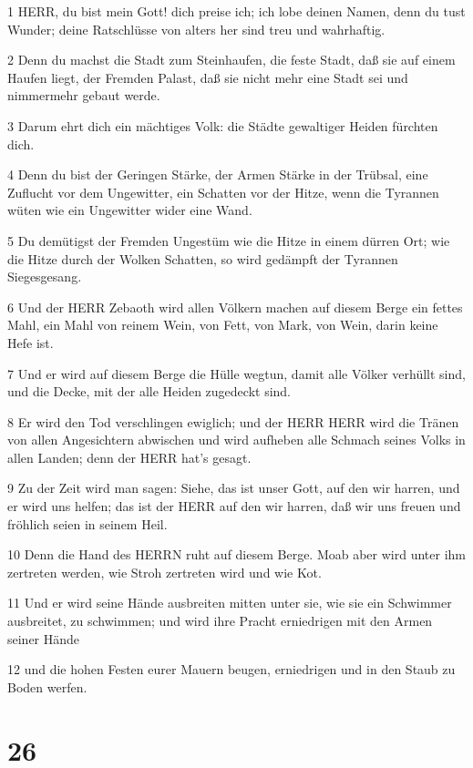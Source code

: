 \par 1 HERR, du bist mein Gott! dich preise ich; ich lobe deinen Namen, denn du tust Wunder; deine Ratschlüsse von alters her sind treu und wahrhaftig.
\par 2 Denn du machst die Stadt zum Steinhaufen, die feste Stadt, daß sie auf einem Haufen liegt, der Fremden Palast, daß sie nicht mehr eine Stadt sei und nimmermehr gebaut werde.
\par 3 Darum ehrt dich ein mächtiges Volk: die Städte gewaltiger Heiden fürchten dich.
\par 4 Denn du bist der Geringen Stärke, der Armen Stärke in der Trübsal, eine Zuflucht vor dem Ungewitter, ein Schatten vor der Hitze, wenn die Tyrannen wüten wie ein Ungewitter wider eine Wand.
\par 5 Du demütigst der Fremden Ungestüm wie die Hitze in einem dürren Ort; wie die Hitze durch der Wolken Schatten, so wird gedämpft der Tyrannen Siegesgesang.
\par 6 Und der HERR Zebaoth wird allen Völkern machen auf diesem Berge ein fettes Mahl, ein Mahl von reinem Wein, von Fett, von Mark, von Wein, darin keine Hefe ist.
\par 7 Und er wird auf diesem Berge die Hülle wegtun, damit alle Völker verhüllt sind, und die Decke, mit der alle Heiden zugedeckt sind.
\par 8 Er wird den Tod verschlingen ewiglich; und der HERR HERR wird die Tränen von allen Angesichtern abwischen und wird aufheben alle Schmach seines Volks in allen Landen; denn der HERR hat's gesagt.
\par 9 Zu der Zeit wird man sagen: Siehe, das ist unser Gott, auf den wir harren, und er wird uns helfen; das ist der HERR auf den wir harren, daß wir uns freuen und fröhlich seien in seinem Heil.
\par 10 Denn die Hand des HERRN ruht auf diesem Berge. Moab aber wird unter ihm zertreten werden, wie Stroh zertreten wird und wie Kot.
\par 11 Und er wird seine Hände ausbreiten mitten unter sie, wie sie ein Schwimmer ausbreitet, zu schwimmen; und wird ihre Pracht erniedrigen mit den Armen seiner Hände
\par 12 und die hohen Festen eurer Mauern beugen, erniedrigen und in den Staub zu Boden werfen.

\chapter{26}

